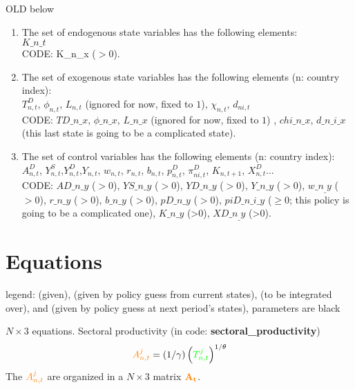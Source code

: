 \documentclass[12pt, bibtotoc, tablecaptionabove, figurecaptionabove, fleqn]{article}
\newcommand{\cl}[1]{{\color{orange}{#1}}}
\newcommand{\st}[1]{{\color{green}{#1}}}
\newcommand{\stnext}[1]{{\color{magenta}{#1}}}
\newcommand{\clnext}[1]{{\color{blue}{#1}}}
\begin{document}
OLD below

\begin{enumerate}
	\item The set of endogenous state variables has the following elements: \\
	 $K\_n\_t$\\
	 CODE: K\_n\_x ($>0$).
	\item The set of exogenous state variables has the following elements (n: country index): \\
	 $T^D_{n,t}$, $\phi_{n,t}$, $L_{n,t}$ (ignored for now, fixed to $1$),  $\chi_{n,t}$, $d_{ni,t}$ \\
	 CODE: $TD\_n\_x$, $\phi\_n\_x$, $L\_n\_x$ (ignored for now, fixed to $1$) , $chi\_n\_x$, $d\_n\_i\_x$ (this last state is going to be a complicated state). \\
	 \item The set of control variables has the following elements (n: country index): \\
	 $A_{n, t}^{D}$, $Y^S_{n,t}$,$Y^D_{n,t}$,$Y_{n,t}$, $w_{n,t}$, $r_{n,t}$, $b_{n,t}$, $p^D_{n,t}$, $\pi^D_{ni,t}$, $K_{n,t+1}$, $X^D_{n,t}$...\\
	 CODE: $AD\_n\_y$ ($>0$), $YS\_n\_y$ ($>0$), $YD\_n\_y$ ($>0$), $Y\_n\_y$ ($>0$), 
	 $w\_n_\_y$ ($>0$), $r\_n\_y$ ($>0$), $b\_n\_y$ ($>0$), $pD\_n\_y$ ($>0$), $piD\_n\_i\_y$ ($\geq 0$; this policy is going to be a complicated one), $K\_n\_y$ (>0), $XD\_n_\_y$ (>0). \\
\end{enumerate}



\section{Equations}

legend: \st{states in green} (given), \cl{controls in orange} (given by policy guess from current states), \stnext{next period's exogenous states in magenta} (to be integrated over), and \clnext{next period's controls in blue} (given by policy guess at next period's states), parameters are black\vspace{5mm}

\noindent $N \times 3$ equations. Sectoral productivity (in code: {\bf{sectoral\_productivity}})
\begin{equation}
\cl{A_{n, t}^{j}}=(1 / \gamma)\left(\st{T_{n, t}^{j}}\right)^{1 / \theta}
\end{equation}
The $\cl{A^j_{n,t}}$ are organized in a $ N \times 3$ matrix $\mathbf{\cl{A_t}}$.
\end{document}

